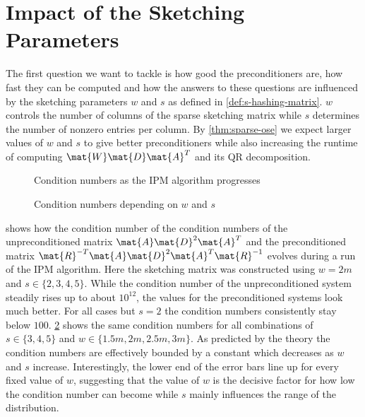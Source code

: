 \section{Impact of the Sketching Parameters}

The first question we want to tackle is how good the preconditioners are, how fast they can be computed and how the answers to these questions are influenced by the sketching parameters \(w\) and \(s\) as defined in \cref{def:s-hashing-matrix}. \(w\) controls the number of columns of the sparse sketching matrix while \(s\) determines the number of nonzero entries per column.
By \cref{thm:sparse-ose} we expect larger values of \(w\) and \(s\) to give better preconditioners while also increasing the runtime of computing \(\mat{W}\mat{D}\mat{A}^T\) and its QR decomposition.

\begin{figure}[tbp]
  \centering%
  \caption{Condition numbers as the IPM algorithm progresses}%
  \label{fig:condition_number_history}
\end{figure}

\begin{figure}[tbp]%
  \centering%
  \caption{Condition numbers depending on \(w\) and \(s\)}%
  \label{fig:condition_number}
\end{figure}%

 shows how the condition number of the condition numbers of the unpreconditioned matrix \(\mat{A}\mat{D}^2\mat{A}^T\) and the preconditioned matrix \(\mat{R}^{-T}\mat{A}\mat{D}^2\mat{A}^T\mat{R}^{-1}\) evolves during a run of the IPM algorithm.
Here the sketching matrix was constructed using \(w=2m\) and \(s \in \{2, 3, 4, 5\}\).
While the condition number of the unpreconditioned system steadily rises up to about \(10^{12}\), the values for the preconditioned systems look much better.
For all cases but \(s=2\) the condition numbers consistently stay below \(100\).
\cref{fig:condition_number} shows the same condition numbers for all combinations of \(s \in \{3,4,5\}\) and \(w \in \{1.5m, 2m, 2.5m, 3m\}\).
As predicted by the theory the condition numbers are effectively bounded by a constant which decreases as \(w\) and \(s\) increase.
Interestingly, the lower end of the error bars line up for every fixed value of \(w\), suggesting that the value of \(w\) is the decisive factor for how low the condition number can become while \(s\) mainly influences the range of the distribution.

